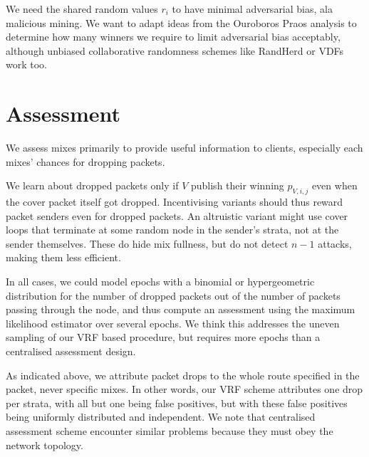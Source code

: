﻿\documentclass{sig-alternate-hotpets}
\newtheorem{question}{Question}
\begin{document}


We need the shared random values $r_i$ to have minimal adversarial bias, ala malicious mining.  We want to adapt ideas from the Ouroboros Praos \cite{OuroborosPraos} analysis to determine how many winners we require to limit adversarial bias acceptably, although unbiased collaborative randomness schemes like RandHerd or VDFs work too.

\section{Assessment}

We assess mixes primarily to provide useful information to clients,
especially each mixes' chances for dropping packets.

We learn about dropped packets only if $V$ publish their winning
$p_{V,i,j}$ even when the cover packet itself got dropped.  
Incentivising variants should thus reward packet senders even
for dropped packets. 
An altruistic variant might use cover loops that terminate at some
random node in the sender's strata, not at the sender themselves.
These do hide mix fullness, but do not detect $n-1$ attacks, making
them less efficient.  

In all cases, we could model epochs with a binomial or hypergeometric
distribution for the number of dropped packets out of the number of
packets passing through the node, and thus compute an assessment
using the maximum likelihood estimator over several epochs.
We think this addresses the uneven sampling of our VRF based procedure,
but requires more epochs than a centralised assessment design.

As indicated above, we attribute packet drops to the whole route
specified in the packet, never specific mixes.  In other words, our
VRF scheme attributes one drop per strata, with all but one being false
positives, but with these false positives being uniformly distributed
and independent.  We note that centralised assessment scheme encounter
similar problems because they must obey the network topology.
\end{document}
